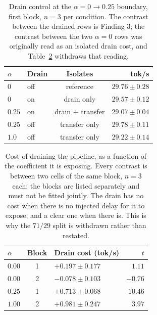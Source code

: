 \documentclass[manuscript,anonymous,review]{acmart}
\begin{document}
\begin{table}[t]
  \centering
  \caption{Drain control at the $\alpha = 0 \rightarrow 0.25$
  boundary, first block, $n = 3$ per condition. The contrast between
  the drained rows is Finding 3; the contrast between the two
  $\alpha = 0$ rows was originally read as an isolated drain cost, and
  Table~\ref{tab:drain-alpha} withdraws that reading.}
  \label{tab:drain}
  \renewcommand{\arraystretch}{1.25}
  \begin{tabular}{@{}llcr@{}}
    \toprule
    $\alpha$ & \textbf{Drain} & \textbf{Isolates} & \textbf{tok/s} \\
    \midrule
    $0$    & off & reference          & $29.76 \pm 0.28$ \\
    $0$    & on  & drain only         & $29.57 \pm 0.12$ \\
    $0.25$ & on  & drain $+$ transfer & $29.07 \pm 0.04$ \\
    $0.25$ & off & transfer only      & $29.78 \pm 0.11$ \\
    $1.0$  & off & transfer only      & $29.22 \pm 0.14$ \\
    \bottomrule
  \end{tabular}
\end{table}

\begin{table}[t]
  \centering
  \caption{Cost of draining the pipeline, as a function of the
  coefficient it is exposing. Every contrast is between two cells of
  the same block, $n = 3$ each; the blocks are listed separately and
  must not be fitted jointly. The drain has no cost when there is no
  injected delay for it to expose, and a clear one when there is. This
  is why the $71/29$ split is withdrawn rather than restated.}
  \label{tab:drain-alpha}
  \renewcommand{\arraystretch}{1.25}
  \begin{tabular}{@{}lclr@{}}
    \toprule
    $\alpha$ & \textbf{Block} & \textbf{Drain cost (tok/s)} & $t$ \\
    \midrule
    $0.00$ & 1 & $+0.197 \pm 0.177$ & $1.11$ \\
    $0.00$ & 2 & $-0.078 \pm 0.103$ & $-0.76$ \\
    $0.25$ & 1 & $+0.713 \pm 0.068$ & $10.46$ \\
    $1.00$ & 2 & $+0.981 \pm 0.247$ & $3.97$ \\
    \bottomrule
  \end{tabular}
\end{table}
\end{document}
